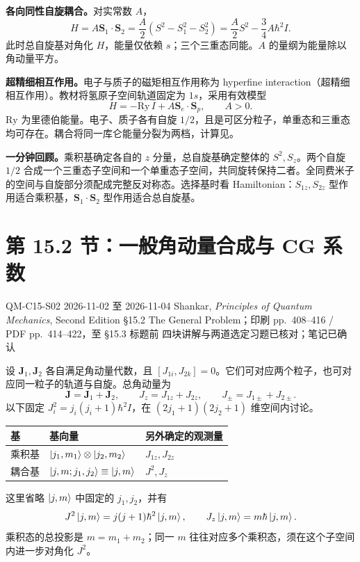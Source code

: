 \textbf{各向同性自旋耦合。}对实常数 $A$，
\begin{equation}
  \boxed{H=A\mathbf S_1\cdot\mathbf S_2
     =\frac A2(S^2-S_1^2-S_2^2)
     =\frac A2S^2-\frac34A\hbar^2I.}
\end{equation}
此时总自旋基对角化 $H$，能量仅依赖 $s$；三个三重态同能。$A$ 的量纲为能量除以角动量平方。

\textbf{超精细相互作用。}电子与质子的磁矩相互作用称为 hyperfine interaction（超精细相互作用）。教材将氢原子空间轨道固定为 $1s$，采用有效模型
\begin{equation}
  H=-\mathrm{Ry}\,I+A\mathbf S_e\cdot\mathbf S_p,\qquad A>0.
\end{equation}
$\mathrm{Ry}$ 为里德伯能量。电子、质子各有自旋 $1/2$，且是可区分粒子，单重态和三重态均可存在。耦合将同一库仑能量分裂为两档，计算见。

\textbf{一分钟回顾。}乘积基确定各自的 $z$ 分量，总自旋基确定整体的 $S^2,S_z$。两个自旋 $1/2$ 合成一个三重态子空间和一个单重态子空间，共同旋转保持二者。全同费米子的空间与自旋部分须配成完整反对称态。选择基时看 Hamiltonian：$S_{1z},S_{2z}$ 型作用适合乘积基，$\mathbf S_1\cdot\mathbf S_2$ 型作用适合总自旋基。

\section{第 15.2 节：一般角动量合成与 CG 系数}
\label{section:QM-C15-S02}
\studymeta
  {QM-C15-S02}
  {2026-11-02 至 2026-11-04}
  {Shankar, \textit{Principles of Quantum Mechanics}, Second Edition}
  {\S 15.2 The General Problem；印刷 pp.~408--416 / PDF pp.~414--422，至 \S 15.3 标题前}
  {四块讲解与两道选定习题已核对；笔记已确认}


设 $\mathbf J_1,\mathbf J_2$ 各自满足角动量代数，且 $[J_{1i},J_{2k}]=0$。它们可对应两个粒子，也可对应同一粒子的轨道与自旋。总角动量为
\begin{equation}
  \mathbf J=\mathbf J_1+\mathbf J_2,\qquad
  J_z=J_{1z}+J_{2z},\qquad J_\pm=J_{1\pm}+J_{2\pm}.
\end{equation}
以下固定 $J_i^2=j_i(j_i+1)\hbar^2I$，在 $(2j_1+1)(2j_2+1)$ 维空间内讨论。
\begin{center}
\begin{tabularx}{\textwidth}{@{}lXX@{}}
  \toprule
  基 & 基向量 & 另外确定的观测量 \\
  \midrule
  乘积基 & $\left|j_1,m_1\right\rangle\otimes\left|j_2,m_2\right\rangle$ & $J_{1z},J_{2z}$ \\
  耦合基 & $\left|j,m;j_1,j_2\right\rangle\equiv\left|j,m\right\rangle$ & $J^2,J_z$ \\
  \bottomrule
\end{tabularx}
\end{center}
这里省略 $\left|j,m\right\rangle$ 中固定的 $j_1,j_2$，并有
\begin{equation}
  J^2\left|j,m\right\rangle=j(j+1)\hbar^2\left|j,m\right\rangle,\qquad
  J_z\left|j,m\right\rangle=m\hbar\left|j,m\right\rangle.
\end{equation}
乘积态的总投影是 $m=m_1+m_2$；同一 $m$ 往往对应多个乘积态，须在这个子空间内进一步对角化 $J^2$。

